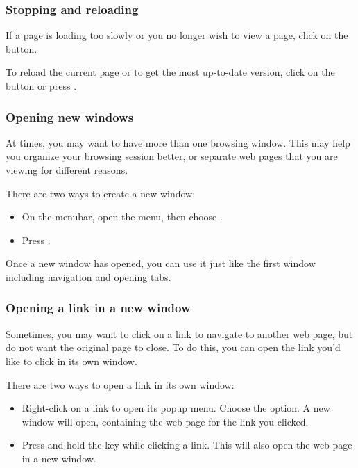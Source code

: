 \subsubsection{Stopping and reloading}

If a page is loading too slowly or you no longer wish to view a page, 
click on the  button.

To reload the current page or to get the most up-to-date version, 
click on the  button or press . 

\subsubsection{Opening new windows}

At times, you may want to have more than one browsing window. This may help
you organize your browsing session better, or separate web pages that you 
are viewing for different reasons. 

There are two ways to create a new window:

\begin{itemize}
  \item On the menubar, open the  menu, then choose 
.
  \item Press .
\end{itemize}

Once a new window has opened, you can use it just like the first window \dash 
including navigation and opening tabs.

\subsubsection{Opening a link in a new window}

Sometimes, you may want to click on a link to navigate to another web page,
but do not want the original page to close. To do this, you can open the 
link you'd like to click in its own window.

There are two ways to open a link in its own window:

\begin{itemize}
  \item Right-click on a link to open its popup menu. Choose the
 option. A new window will open, containing
the web page for the link you clicked.
  \item Press-and-hold the  key while clicking a link. This will also open the web page in a new window.
\end{itemize}

